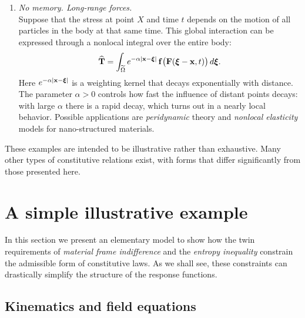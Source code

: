 \begin{enumerate}
	\item \textit{No memory. Long-range forces.} \\
	Suppose that the stress at point $X$ and time $t$ depends on the motion of all particles in the body at that same time. This global interaction can be expressed through a nonlocal integral over the entire body:
	\begin{equation}
		\widehat{\mathbf{T}} = \int_{\widetilde{\Omega}} e^{-\alpha |\mathbf{x} - \bm{\xi}|} \, \mathbf{f}\big(\mathbf{F}(\bm{\xi} - \mathbf{x}, t)\big) \, d\bm{\xi}.
	\end{equation}
Here $e^{-\alpha |\mathbf{x} - \bm{\xi}|} $ is  a weighting kernel that decays exponentially with distance. The parameter $\alpha>0$ controls how fast the influence of distant points decays: with large $\alpha$ there is a rapid decay, which turns out in a  nearly local behavior.
Possible applications are \textit{peridynamic} theory and \textit{nonlocal elasticity} models for nano-structured materials.
\end{enumerate}

These examples are intended to be illustrative rather than exhaustive. Many other types of constitutive relations exist, with forms that differ significantly from those presented here.


\section{A simple illustrative example}

In this section we present an elementary model to show how the twin
requirements of \emph{material frame indifference} and the
\emph{entropy inequality} constrain the admissible form of constitutive
laws.  As we shall see, these constraints can drastically simplify the
structure of the response functions.

\subsection{Kinematics and field equations}


